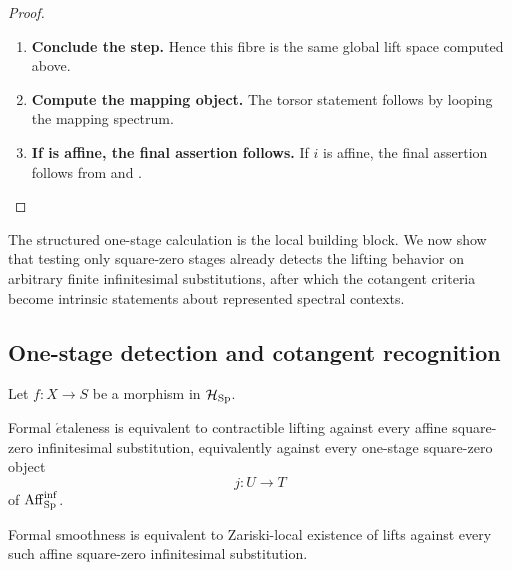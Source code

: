 \begin{proof}
\begin{enumerate}[label=\textup{(\arabic*)}]
    \item \textbf{Conclude the step.}
    Hence this fibre is the same global lift space computed above.

    \item \textbf{Compute the mapping object.}
    The torsor statement follows by looping the mapping spectrum.

    \item \textbf{If is affine, the final assertion follows.}
    If \(i\) is affine, the final assertion follows from
     and .
\end{enumerate}
\end{proof}
The structured one-stage calculation is the local building block. We now show
that testing only square-zero stages already detects the lifting behavior on
arbitrary finite infinitesimal substitutions, after which the cotangent
criteria become intrinsic statements about represented spectral contexts.

\subsection{One-stage detection and cotangent recognition}

\begin{proposition}
\label{prop:formal-lifting-one-stage-detection}
Let \(f:X\to S\) be a morphism in \(\mathcal H_{\operatorname{Sp}}\).

Formal \(\acute{e}\)taleness is equivalent to contractible lifting against
every affine square-zero infinitesimal substitution, equivalently against
every one-stage square-zero object
\[
    j:U\longrightarrow T
\]
of \(\operatorname{Aff}_{\operatorname{Sp}}^{\inf}\).

Formal smoothness is equivalent to Zariski-local existence of lifts against
every such affine square-zero infinitesimal substitution.
\end{proposition}

